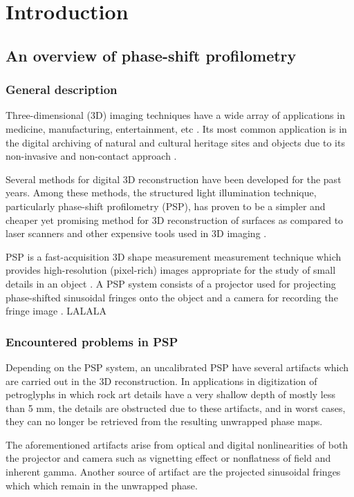 \chapter{Introduction}

\section{An overview of phase-shift profilometry}
\subsection{General description}

Three-dimensional (3D) imaging techniques have a wide array of applications in medicine, manufacturing, entertainment, etc \cite{}. 
Its most common application is in the digital archiving of natural and cultural heritage sites and objects due to its non-invasive and non-contact approach \cite{Simon2013}. 

Several methods for digital 3D reconstruction have been developed for the past years. Among these methods, the structured light illumination technique, particularly phase-shift profilometry (PSP), has proven to be a simpler and cheaper yet promising method for 3D reconstruction of surfaces as compared to laser scanners and other expensive tools used in 3D imaging \cite{Zhang2002, Chrova200x}. 

PSP is a fast-acquisition 3D shape measurement measurement technique which provides high-resolution (pixel-rich) images appropriate for the study of small details in an object \cite{}. 
A PSP system consists of a projector used for projecting phase-shifted sinusoidal fringes onto the object and a camera for recording the fringe image \cite{}. LALALA

\subsection{Encountered problems in PSP}

Depending on the PSP system, an uncalibrated PSP have several artifacts which are carried out in the 3D reconstruction. 
In applications in digitization of petroglyphs in which rock art details have a very shallow depth of mostly less than 5 mm, the details are obstructed due to these artifacts, and in worst cases, they can no longer be retrieved from the resulting unwrapped phase maps.

The aforementioned artifacts arise from optical and digital nonlinearities of both the projector and camera such as vignetting effect or nonflatness of field and inherent gamma. 
Another source of artifact are the projected sinusoidal fringes which which remain in the unwrapped phase. 

